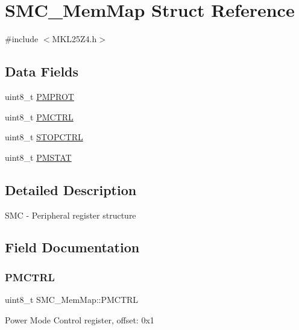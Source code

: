 \hypertarget{struct_s_m_c___mem_map}{}\section{S\+M\+C\+\_\+\+Mem\+Map Struct Reference}
\label{struct_s_m_c___mem_map}


{\ttfamily \#include $<$M\+K\+L25\+Z4.\+h$>$}

\subsection*{Data Fields}
\begin{DoxyCompactItemize}
\item 
uint8\+\_\+t \hyperlink{struct_s_m_c___mem_map_afd03d93a7823dc65f53216dca15a2a95}{P\+M\+P\+R\+OT}
\item 
uint8\+\_\+t \hyperlink{struct_s_m_c___mem_map_a2a5d946bb55640fd179c4065937bea5c}{P\+M\+C\+T\+RL}
\item 
uint8\+\_\+t \hyperlink{struct_s_m_c___mem_map_a3065a98baea0fc4c0099b9782554a662}{S\+T\+O\+P\+C\+T\+RL}
\item 
uint8\+\_\+t \hyperlink{struct_s_m_c___mem_map_a0fddef87e229c4cf1b3be0d29589e964}{P\+M\+S\+T\+AT}
\end{DoxyCompactItemize}


\subsection{Detailed Description}
S\+MC -\/ Peripheral register structure 

\subsection{Field Documentation}
\mbox{\label{struct_s_m_c___mem_map_a2a5d946bb55640fd179c4065937bea5c}} 
\subsubsection{\texorpdfstring{P\+M\+C\+T\+RL}{PMCTRL}}
{\footnotesize\ttfamily uint8\+\_\+t S\+M\+C\+\_\+\+Mem\+Map\+::\+P\+M\+C\+T\+RL}

Power Mode Control register, offset\+: 0x1 \mbox{\label{struct_s_m_c___mem_map_afd03d93a7823dc65f53216dca15a2a95}} 
